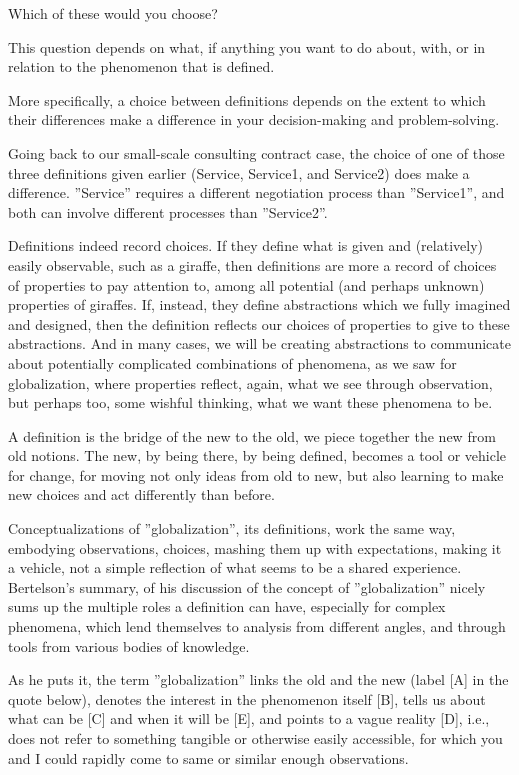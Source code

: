 Which of these would you choose?

This question depends on what, if anything you want to do about, with, or in relation to the phenomenon that is defined.

More specifically, a choice between definitions depends on the extent to which their differences make a difference in your decision-making and problem-solving.

Going back to our small-scale consulting contract case, the choice of one of those three definitions given earlier (Service, Service1, and Service2) does make a difference. ''Service'' requires a different negotiation process than ''Service1'', and both can involve different processes than ''Service2''.

Definitions indeed record choices. If they define what is given and (relatively) easily observable, such as a giraffe, then definitions are more a record of choices of properties to pay attention to, among all potential (and perhaps unknown) properties of giraffes. If, instead, they define abstractions which we fully imagined and designed, then the definition reflects our choices of properties to give to these abstractions. And in many cases, we will be creating abstractions to communicate about potentially complicated combinations of phenomena, as we saw for globalization, where properties reflect, again, what we see through observation, but perhaps too, some wishful thinking, what we want these phenomena to be.

A definition is the bridge of the new to the old, we piece together the new from old notions. The new, by being there, by being defined, becomes a tool or vehicle for change, for moving not only ideas from old to new, but also learning to make new choices and act differently than before. 

Conceptualizations of ''globalization'', its definitions, work the same way, embodying observations, choices, mashing them up with expectations, making it a vehicle, not a simple reflection of what seems to be a shared experience. Bertelson's summary, of his discussion of the concept of ''globalization'' nicely sums up the multiple roles a definition can have, especially for complex phenomena, which lend themselves to analysis from different angles, and through tools from various bodies of knowledge.

As he puts it, the term ''globalization'' links the old and the new (label [A] in the quote below), denotes the interest in the phenomenon itself [B], tells us about what can be [C] and when it will be [E], and points to a vague reality [D], i.e., does not refer to something tangible or otherwise easily accessible, for which you and I could rapidly come to same or similar enough observations.

